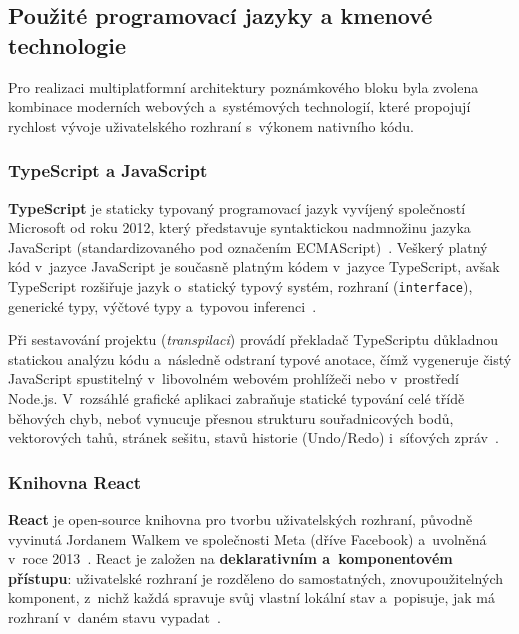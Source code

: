 \documentclass[12pt, a4paper, oneside]{article}
\begin{document}
\subsection{Použité programovací jazyky a kmenové technologie}
\label{sec:teorie_technologie}

Pro realizaci multiplatformní architektury poznámkového bloku byla zvolena kombinace moderních webových a~systémových technologií, které propojují rychlost vývoje uživatelského rozhraní s~výkonem nativního kódu.

\subsubsection{TypeScript a JavaScript}
\label{sec:teorie_typescript}

\textbf{TypeScript} je staticky typovaný programovací jazyk vyvíjený společností Microsoft od roku 2012, který představuje syntaktickou nadmnožinu jazyka JavaScript (standardizovaného pod označením ECMAScript)~\cite{typescript_docs}. Veškerý platný kód v~jazyce JavaScript je současně platným kódem v~jazyce TypeScript, avšak TypeScript rozšiřuje jazyk o~statický typový systém, rozhraní (\texttt{interface}), generické typy, výčtové typy a~typovou inferenci~\cite{typescript_docs}.

Při sestavování projektu (\textit{transpilaci}) provádí překladač TypeScriptu důkladnou statickou analýzu kódu a~následně odstraní typové anotace, čímž vygeneruje čistý JavaScript spustitelný v~libovolném webovém prohlížeči nebo v~prostředí Node.js. V~rozsáhlé grafické aplikaci zabraňuje statické typování celé třídě běhových chyb, neboť vynucuje přesnou strukturu souřadnicových bodů, vektorových tahů, stránek sešitu, stavů historie (Undo/Redo) i~síťových zpráv~\cite{typescript_docs}.

\subsubsection{Knihovna React}
\label{sec:teorie_react}

\textbf{React} je open-source knihovna pro tvorbu uživatelských rozhraní, původně vyvinutá Jordanem Walkem ve společnosti Meta (dříve Facebook) a~uvolněná v~roce 2013~\cite{react_docs}. React je založen na \textbf{deklarativním a~komponentovém přístupu}: uživatelské rozhraní je rozděleno do samostatných, znovupoužitelných komponent, z~nichž každá spravuje svůj vlastní lokální stav a~popisuje, jak má rozhraní v~daném stavu vypadat~\cite{react_docs}.
\end{document}
